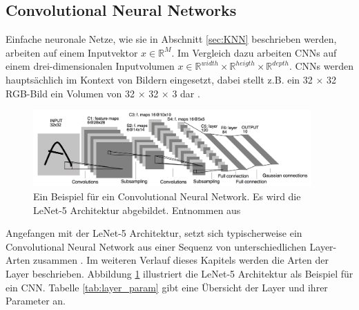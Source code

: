 \subsection{Convolutional Neural Networks}
\label{sec:CNN}
Einfache neuronale Netze, wie sie in Abschnitt \ref{sec:KNN} beschrieben werden, arbeiten auf einem Inputvektor $x \in \mathbb{R}^{M}$. Im Vergleich dazu arbeiten CNNs auf einem drei-dimensionalen Inputvolumen $x \in \mathbb{R}^{width} \times \mathbb{R}^{heigth} \times \mathbb{R}^{depth}$. CNNs werden hauptsächlich im Kontext von Bildern eingesetzt, dabei stellt z.B. ein 32 $\times$ 32 RGB-Bild ein Volumen von 32 $\times$ 32 $\times$ 3 dar \cite{CS231nConvolutionalNeurala}.

\begin{figure}
	\centering
	\includegraphics[width=0.95\textwidth]{images/ann_conv/lenet5.png}
	\caption{Ein Beispiel für ein Convolutional Neural Network. Es wird die LeNet-5 Architektur abgebildet. Entnommen aus \cite{lecunGradientBasedLearningApplied1998}  }
	\label{fig:lenet5}
\end{figure}


Angefangen mit der LeNet-5 \cite{lecunGradientBasedLearningApplied1998} Architektur, setzt sich typischerweise ein Convolutional Neural Network aus einer Sequenz von unterschiedlichen Layer-Arten zusammen \cite{szegedyGoingDeeperConvolutions2015, CS231nConvolutionalNeurala}. Im weiteren Verlauf dieses Kapitels werden die Arten der Layer beschrieben. Abbildung \ref{fig:lenet5} illustriert die LeNet-5 Architektur als Beispiel für ein CNN. Tabelle \ref{tab:layer_param} gibt eine Übersicht der Layer und ihrer Parameter an.

